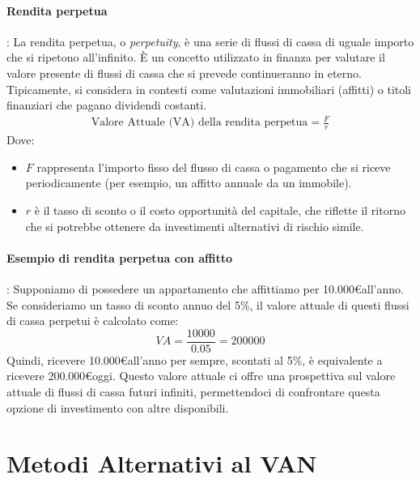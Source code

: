 \documentclass{article}
\begin{document}
\paragraph{Rendita perpetua} : La rendita perpetua, o \textit{perpetuity}, è una serie di flussi di cassa di uguale importo che si ripetono all'infinito. È un concetto utilizzato in finanza per valutare il valore presente di flussi di cassa che si prevede continueranno in eterno. Tipicamente, si considera in contesti come valutazioni immobiliari (affitti) o titoli finanziari che pagano dividendi costanti.
\begin{align*}
    \text{Valore Attuale (VA) della rendita perpetua} = \frac{F}{r}
\end{align*}
Dove:
\begin{itemize}
    \item \(F\) rappresenta l'importo fisso del flusso di cassa o pagamento che si riceve periodicamente (per esempio, un affitto annuale da un immobile).
    \item \(r\) è il tasso di sconto o il costo opportunità del capitale, che riflette il ritorno che si potrebbe ottenere da investimenti alternativi di rischio simile.
\end{itemize}
\paragraph{Esempio di rendita perpetua con affitto} : Supponiamo di possedere un appartamento che affittiamo per 10.000\euro all'anno. Se consideriamo un tasso di sconto annuo del 5\%, il valore attuale di questi flussi di cassa perpetui è calcolato come:
\[ VA = \frac{10000}{0.05} = 200000 \]
Quindi, ricevere 10.000\euro all'anno per sempre, scontati al 5\%, è equivalente a ricevere 200.000\euro oggi. Questo valore attuale ci offre una prospettiva sul valore attuale di flussi di cassa futuri infiniti, permettendoci di confrontare questa opzione di investimento con altre disponibili.

\newpage

\section*{Metodi Alternativi al VAN}
\end{document}
